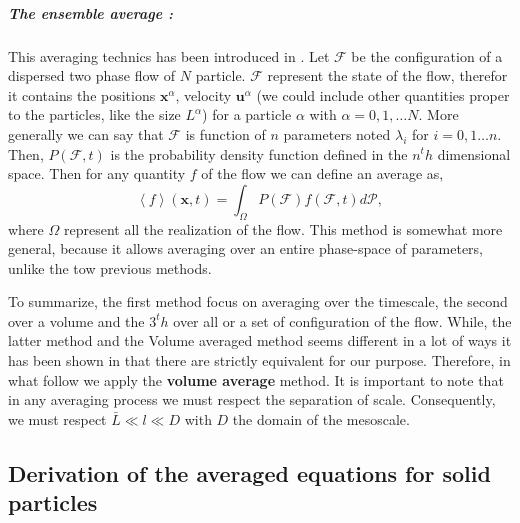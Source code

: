 \subparagraph*{The ensemble average :} 
This averaging technics has been introduced in \citet{zhang1994averaged}.
Let $\mathcal{F}$ be the configuration of a dispersed two phase flow of $N$ particle. 
$\mathcal{F}$ represent the state of the flow, therefor it contains the positions $\bm{x}^\alpha$, velocity $\bm{u}^\alpha$ (we could include other quantities proper to the particles, like the size $L^\alpha$) for a particle $\alpha$ with $\alpha = 0,1,\ldots N$.
More generally we can say that $\mathcal{F}$ is function of $n$ parameters noted $\lambda_i$ for $i = 0,1 \ldots n$.  
Then, $P(\mathcal{F},t)$ is the probability density function defined in the $n^th$ dimensional space. 
Then for any quantity $f$ of the flow we can define an average as,
\begin{equation}
    \label{eq:enselblea}
    \left<f\right>(\bm{x},t) = \int_\Omega P(\mathcal{F}) f(\mathcal{F},t)d\mathcal{P},
\end{equation}
where $\Omega$ represent all the realization of the flow. 
This method is somewhat more general, because it allows averaging over an entire phase-space of parameters, unlike the tow previous methods. 

To summarize, the first method focus on averaging over the timescale, the second over a volume and the $3^th$ over all or a set of configuration of the flow.
While, the latter method and the Volume averaged method seems different in a lot of ways it has been shown in \citet{jackson1997locally} that there are strictly equivalent for our purpose.
Therefore, in what follow we apply the \textbf{volume average} method.
It is important to note that in any averaging process we must respect the separation of scale. 
Consequently, we must respect $\bar{L}\ll l\ll D$ with $D$ the domain of the mesoscale. 

\subsection{Derivation of the averaged equations for solid particles}

